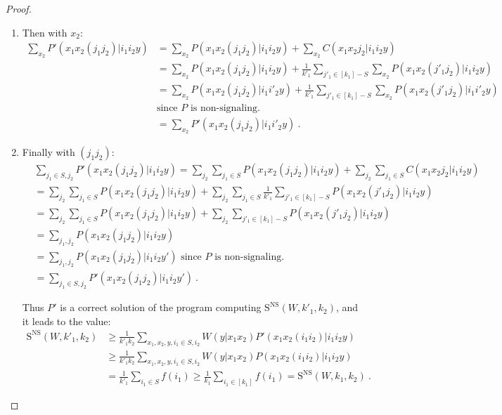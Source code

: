\documentclass[11pt]{article}
\theoremstyle{definition}
\theoremstyle{remark}
\begin{document}
\begin{proof}
\begin{enumerate}
\begin{enumerate}
    \item Then with $x_2$:
    \begin{equation}
      \begin{aligned}
      \sum_{x_2} P'(x_1x_2(j_1j_2)|i_1i_2y) &= \sum_{x_2} P(x_1x_2(j_1j_2)|i_1i_2y) + \sum_{x_2} C(x_1x_2j_2|i_1i_2y)\\
      &= \sum_{x_2} P(x_1x_2(j_1j_2)|i_1i_2y) + \frac{1}{k'_1}\sum_{j'_1 \in [k_1]-S}\sum_{x_2}P(x_1x_2(j'_1j_2)|i_1i_2y)\\
      &= \sum_{x_2} P(x_1x_2(j_1j_2)|i_1i'_2y) + \frac{1}{k'_1}\sum_{j'_1 \in [k_1]-S}\sum_{x_2}P(x_1x_2(j'_1j_2)|i_1i'_2y)\\
      &\text{since $P$ is non-signaling.}\\
      &= \sum_{x_2} P'(x_1x_2(j_1j_2)|i_1i'_2y) \ .
      \end{aligned}
    \end{equation}
    \item Finally with $(j_1j_2)$:
    \begin{equation}
      \begin{aligned}
      &\sum_{j_1 \in S,j_2} P'(x_1x_2(j_1j_2)|i_1i_2y) = \sum_{j_2}\sum_{j_1 \in S} P(x_1x_2(j_1j_2)|i_1i_2y) + \sum_{j_2}\sum_{j_1 \in S} C(x_1x_2j_2|i_1i_2y)\\
      &= \sum_{j_2}\sum_{j_1 \in S} P(x_1x_2(j_1j_2)|i_1i_2y) + \sum_{j_2}\sum_{j_1 \in S}\frac{1}{k'_1}\sum_{j'_1 \in [k_1]-S}P(x_1x_2(j'_1j_2)|i_1i_2y)\\
      &= \sum_{j_2}\sum_{j_1 \in S} P(x_1x_2(j_1j_2)|i_1i_2y) + \sum_{j_2}\sum_{j'_1 \in [k_1]-S}P(x_1x_2(j'_1j_2)|i_1i_2y)\\
      &= \sum_{j_1,j_2} P(x_1x_2(j_1j_2)|i_1i_2y)\\
      &= \sum_{j_1,j_2} P(x_1x_2(j_1j_2)|i_1i_2y') \text{ since $P$ is non-signaling.}\\
      &= \sum_{j_1 \in S,j_2} P'(x_1x_2(j_1j_2)|i_1i_2y') \ .
      \end{aligned}
    \end{equation}

       Thus $P'$ is a correct solution of the program computing $\mathrm{S}^{\mathrm{NS}}(W,k'_1,k_2)$, and it leads to the value:
    \begin{equation}
      \begin{aligned}
         \mathrm{S}^{\mathrm{NS}}(W,k'_1,k_2) &\geq \frac{1}{k'_1k_2} \sum_{x_1,x_2,y,i_1 \in S,i_2} W(y|x_1x_2)P'(x_1x_2(i_1i_2)|i_1i_2y)\\
         &\geq \frac{1}{k'_1k_2} \sum_{x_1,x_2,y,i_1 \in S,i_2} W(y|x_1x_2)P(x_1x_2(i_1i_2)|i_1i_2y)\\
         &= \frac{1}{k'_1} \sum_{i_1 \in S} f(i_1) \geq \frac{1}{k_1} \sum_{i_1 \in [k_1]} f(i_1) = \mathrm{S}^{\mathrm{NS}}(W,k_1,k_2) \ .
      \end{aligned}
    \end{equation}
    \end{enumerate}


\end{enumerate}
\end{proof}
\end{document}
